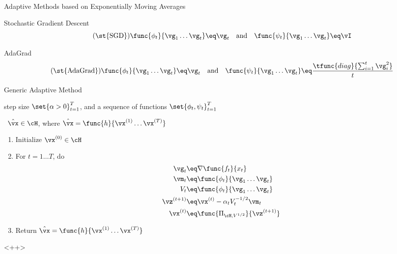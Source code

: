 \documentclass{article}
\begin{document}
\begin{psection}{Adaptive Methods based on Exponentially Moving Averages}

	\begin{psubsection}{Stochastic Gradient Descent}
		\begin{equation}
			\tag{\st{SGD}}
			\func{\phi_t}{\vg_1 \dots \vg_t} \eq \vg_t \quad\text{and}\quad	\func{\psi_t}{\vg_1 \dots \vg_t} \eq \vI
		\end{equation}
	\end{psubsection}

	\begin{psubsection}{AdaGrad}
		\begin{align*}
			\tag{\st{AdaGrad}}
			\func{\phi_t}{\vg_1 \dots \vg_t} \eq \vg_t \quad\text{and}\quad	\func{\psi_t}{\vg_1 \dots \vg_t} \eq \frac{\tfunc{diag}{\sum_{i = 1}^t \vg_i^2}}{t}
		\end{align*}
	\end{psubsection}

	\begin{algo}[0.9\textwidth]{Generic Adaptive Method}

		 \quad step size $\set{\alpha > 0}_{t = 1}^T$, and a sequence of functions $\set{\phi_t, \psi_t}_{t = 1}^T$ \sbr

		\, $\hat{\vx} \in \cH$, where $\hat{\vx} = \func{h}{\vx^{(1)} \dots \vx^{(T)}}$ \sbr


		\begin{enumerate}
			\item Initialize $\vx^{(0)} \in \cH$
			\item For $t = 1 \dots T$, do
				\begin{align*}
					\vg_t				&\eq	\nabla \func{f_t}{x_t}						\\
					\vm_t			&\eq	\func{\phi_t}{\vg_1 \dots \vg_t}			\\
					V_t				&\eq	\func{\phi_t}{\vg_1 \dots \vg_t}			\\
					\vz^{(t + 1)}	&\eq	\vx^{(t)} - \alpha_t V_t^{- 1 / 2} \vm_t	\\
					\vx^{(t)}		&\eq	\func{\Pi_{\cH, V^{1/2}}}{\vz^{(t + 1)}}
				\end{align*}
			\item Return $\hat{\vx} = \func{h}{\vx^{(1)} \dots \vx^{(T)}}$
		\end{enumerate}

	\end{algo}

\end{psection}<++>



\end{document}
